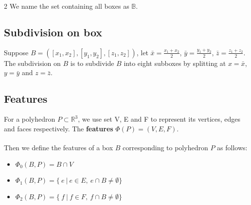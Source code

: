 \documentclass[twoside]{article}
\begin{document}
\begin{multicols}{2}
		\indent We name the set containing all boxes as $\mathbb{B}$.
		\fi
		
\subsection {Subdivision on box}
Suppose $B=([x_1,x_2],[y_1,y_2],[z_1,z_2])$, let $\bar{x} = \frac {x_1+x_2}{2}$, $\bar{y} = \frac {y_1+y_2}{2}$, $\bar{z} = \frac {z_1+z_2}{2}$. The subdivision on $B$ is to subdivide $B$ into eight subboxes by splitting at $x = \bar{x}$, $y = \bar{y}$ and $z = \bar{z}$.

	
\subsection {Features}

For a polyhedron $P \subset \mathbb{R}^3$, we use set V, E and F to represent its vertices, edges and faces respectively. The \textbf{features} $\Phi(P) = (V, E, F)$.\\
\\
\indent Then we define the features of a box $B$ corresponding to polyhedron $P$ as follows:

\begin{itemize}
	\item $\Phi_0(B, P)= B\cap V$
	\item $\Phi_1(B, P)=\{\ e\ |\ e \in E,\ e \cap B \not= \emptyset\}$
	\item $\Phi_2(B, P)=\{\ f\ |\ f \in F,\ f \cap B \not= \emptyset\}$
	\newline
\end{itemize}


\end{multicols}
\end{document}
